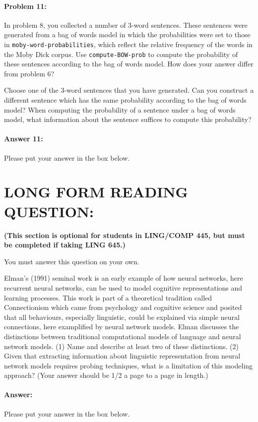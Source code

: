 \documentclass[10pt]{article}
\newenvironment{AnswerBox}{\begin{mdframed}[style=simple]}{\end{mdframed}}
\begin{document}
\paragraph{Problem 11:}

In problem 8, you collected a number of 3-word sentences. These
sentences were generated from a bag of words model in which the
probabilities were set to those in \texttt{moby-word-probabilities},
which reflect the relative frequency of the words in the Moby Dick
corpus. Use \texttt{compute-BOW-prob} to compute the probability of
these sentences according to the bag of words model. How does your
answer differ from problem 6?

Choose one of the 3-word sentences that you have generated. Can you
construct a different sentence which has the same probability
according to the bag of words model? When computing the probability of
a sentence under a bag of words model, what information about the
sentence suffices to compute this probability?

\paragraph{Answer 11:} Please put your answer in the box below.

\begin{AnswerBox}%


\end{AnswerBox}%

\newpage
\section*{LONG FORM READING QUESTION:} 
\textbf{(This section is optional for students in LING/COMP 445, but must be completed if taking LING 645.)}

You must answer this question on your own.

Elman's (1991) seminal work is an early example of how neural networks, here recurrent neural networks, can be used to model cognitive representations and learning processes. This work is part of a theoretical tradition called Connectionism which came from psychology and cognitive science and posited that all behaviours, especially linguistic, could be explained via simple neural connections, here examplified by neural network models. Elman discusses the distinctions between traditional computational models of language and neural network models. (1) Name and describe at least two of these distinctions. (2) Given that extracting information about linguistic representation from neural network models requires probing techniques, what is a limitation of this modeling approach? (Your answer should be 1/2 a page to a page in length.)


\paragraph{Answer:} Please put your answer in the box below.

\begin{AnswerBox}%


\end{AnswerBox}%
\end{document}
